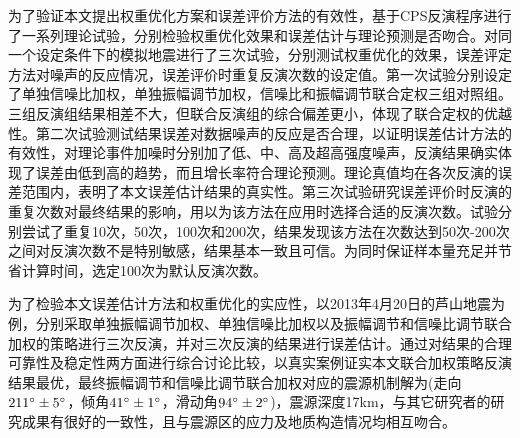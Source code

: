 为了验证本文提出权重优化方案和误差评价方法的有效性，基于CPS反演程序进行了一系列理论试验，分别检验权重优化效果和误差估计与理论预测是否吻合。对同一个设定条件下的模拟地震进行了三次试验，分别测试权重优化的效果，误差评定方法对噪声的反应情况，误差评价时重复反演次数的设定值。第一次试验分别设定了单独信噪比加权，单独振幅调节加权，信噪比和振幅调节联合定权三组对照组。三组反演组结果相差不大，但联合反演组的综合偏差更小，体现了联合定权的优越性。第二次试验测试结果误差对数据噪声的反应是否合理，以证明误差估计方法的有效性，对理论事件加噪时分别加了低、中、高及超高强度噪声，反演结果确实体现了误差由低到高的趋势，而且增长率符合理论预测。理论真值均在各次反演的误差范围内，表明了本文误差估计结果的真实性。第三次试验研究误差评价时反演的重复次数对最终结果的影响，用以为该方法在应用时选择合适的反演次数。试验分别尝试了重复10次，50次，100次和200次，结果发现该方法在次数达到50次-200次之间对反演次数不是特别敏感，结果基本一致且可信。为同时保证样本量充足并节省计算时间，选定100次为默认反演次数。

为了检验本文误差估计方法和权重优化的实应性，以2013年4月20日的芦山地震为例，分别采取单独振幅调节加权、单独信噪比加权以及振幅调节和信噪比调节联合加权的策略进行三次反演，并对三次反演的结果进行误差估计。通过对结果的合理可靠性及稳定性两方面进行综合讨论比较，以真实案例证实本文联合加权策略反演结果最优，最终振幅调节和信噪比调节联合加权对应的震源机制解为(走向$211^\circ\pm5^\circ$，倾角$41^\circ\pm1^\circ$，滑动角$94^\circ\pm2^\circ$)，震源深度17km，与其它研究者的研究成果有很好的一致性，且与震源区的应力及地质构造情况均相互吻合。
